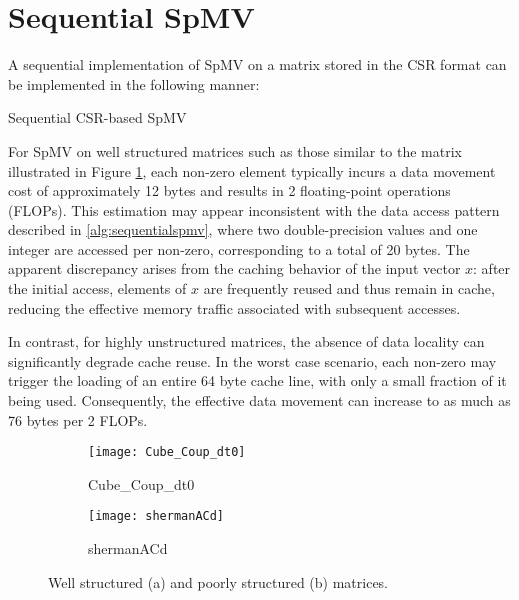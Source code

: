 \section{Sequential SpMV}
A sequential implementation of SpMV on a matrix stored in the CSR format can be implemented in the following manner:
\medskip

\begin{algorithm}[htbp]
    \caption{Sequential CSR-based SpMV}
    \SetAlgoVlined

\end{algorithm}
\label{alg:sequentialspmv}
\medskip

For SpMV on well structured matrices such as those similar to the matrix illustrated in Figure \ref{fig:Cube_Coup_dt0}, each non-zero element typically incurs a data movement cost of approximately 12 bytes and results in 2 floating-point operations (FLOPs). This estimation may appear inconsistent with the data access pattern described in \autoref{alg:sequentialspmv}, where two double-precision values and one integer are accessed per non-zero, corresponding to a total of 20 bytes. The apparent discrepancy arises from the caching behavior of the input vector \(x\): after the initial access, elements of \(x\) are frequently reused and thus remain in cache, reducing the effective memory traffic associated with subsequent accesses.
\medskip

In contrast, for highly unstructured matrices, the absence of data locality can significantly degrade cache reuse. In the worst case scenario, each non-zero may trigger the loading of an entire 64 byte cache line, with only a small fraction of it being used. Consequently, the effective data movement can increase to as much as 76 bytes per 2 FLOPs.

\begin{figure}[H]
    \centering
    \begin{subfigure}[t]{0.45\textwidth}
        \centering
        \texttt{[image: Cube\_Coup\_dt0]}
        \caption{Cube\_Coup\_dt0}
    \end{subfigure}
    \hfill
    \begin{subfigure}[t]{0.45\textwidth}
        \centering
        \texttt{[image: shermanACd]}
        \caption{shermanACd}
    \end{subfigure}
    \caption{Well structured (a) and poorly structured (b) matrices.}
    \label{fig:Cube_Coup_dt0}
\end{figure}

